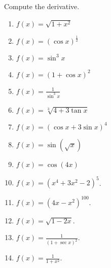 Compute the derivative.
\begin{multicols}{2}
\begin{enumerate}
\item   $\displaystyle f(x)=\sqrt{1+x^2}$

\item \label{problemd/dx(cos(x))^(1/2)}  $\displaystyle f(x)=(\cos x)^{\frac{1}{ 2}}$

\item $\displaystyle f(x)=\sin^3 x$

\item \label{problemd/dx(1+cos(x))^2} $\displaystyle f(x)=(1+\cos x)^2$

\item   $\displaystyle f(x)=\frac{1}{\sin^3x}$

\item  $\displaystyle f(x)= \sqrt[3]{4+3\tan x}$

\item  $f(x)=(\cos x + 3\sin x)^4$

\item \label{problemd/dx(sin(sqrt(x)))}  $f(x)=\sin\left(\sqrt{x}\right)$

\item  $f(x)=\cos(4x)$

\item $\displaystyle f(x)= (x^4+3x^2-2)^5$.

\item $\displaystyle f(x)= (4x-x^2)^{100}$.

\item $\displaystyle f(x)= \sqrt{1-2x}$.

\item $\displaystyle f(x)= \frac{1}{(1+\sec x)^2}$.

\item $\displaystyle f(x)=\frac{1}{1+x^2} $.


\end{enumerate}
\end{multicols}
